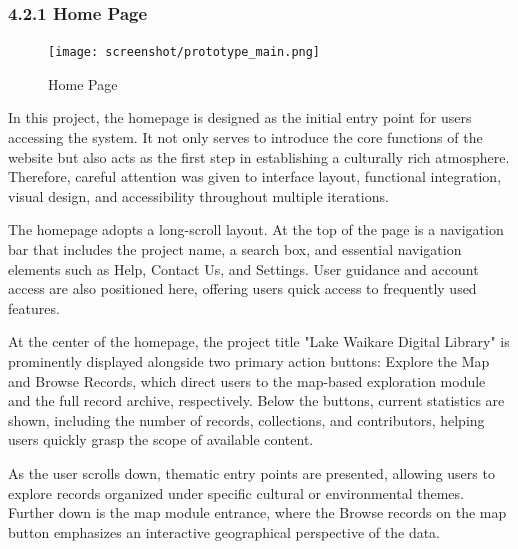 ﻿%


\subsubsection*{4.2.1 Home Page}

\begin{figure}[H]
    \centering
    \texttt{[image: screenshot/prototype\_main.png]}
    \caption{Home Page}
    \label{fig:architecture}
\end{figure}
In this project, the homepage is designed as the initial entry point for users accessing the system. It not only serves to introduce the core functions of the website but also acts as the first step in establishing a culturally rich atmosphere. Therefore, careful attention was given to interface layout, functional integration, visual design, and accessibility throughout multiple iterations.

The homepage adopts a long-scroll layout. At the top of the page is a navigation bar that includes the project name, a search box, and essential navigation elements such as Help, Contact Us, and Settings. User guidance and account access are also positioned here, offering users quick access to frequently used features.

At the center of the homepage, the project title "Lake Waikare Digital Library" is prominently displayed alongside two primary action buttons: Explore the Map and Browse Records, which direct users to the map-based exploration module and the full record archive, respectively. Below the buttons, current statistics are shown, including the number of records, collections, and contributors, helping users quickly grasp the scope of available content.

As the user scrolls down, thematic entry points are presented, allowing users to explore records organized under specific cultural or environmental themes. Further down is the map module entrance, where the Browse records on the map button emphasizes an interactive geographical perspective of the data.

